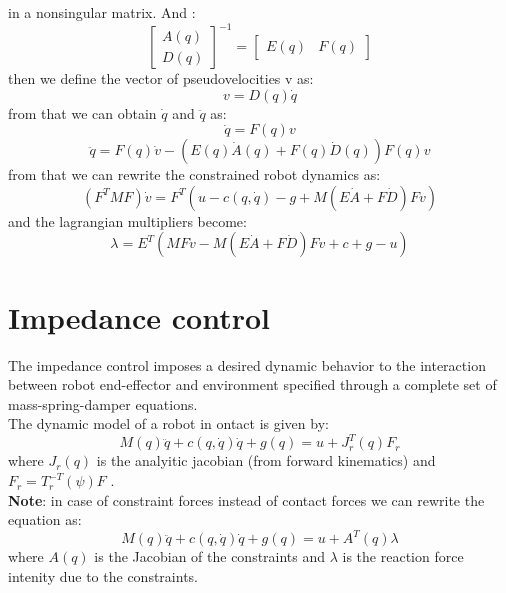 \documentclass[a4paper,12pt]{article}
\begin{document}
in a nonsingular matrix.
And :
\begin{equation}
    \begin{bmatrix}
        A(q)\\
        D(q)
    \end{bmatrix}^{-1}= \begin{bmatrix}
        E(q) & F(q)
    \end{bmatrix}
    \end{equation}
then we define the vector of pseudovelocities v as:
\begin{equation}
    v = D(q)\dot{q}
\end{equation}
from that we can obtain $\dot{q}$ and $\ddot{q}$ as:
\begin{equation}
    \dot{q} = F(q)v
\end{equation}
\begin{equation}
    \ddot{q} = F(q)\dot{v}  - (E(q)\dot{A}(q) + F(q)\dot{D}(q))F(q)v
\end{equation}
from that we can rewrite the constrained robot dynamics as:
\begin{equation}
   (F^TMF)\dot{v} = F^T(u-c(q,\dot{q})-g + M(E\dot{A}+F\dot{D})Fv)
\end{equation}
and the lagrangian multipliers become:
\begin{equation}
    \lambda = E^T(MF\dot{v}-M(E\dot{A}+F\dot{D})Fv + c + g -u)
\end{equation}

\section{Impedance control}
The impedance control imposes a desired dynamic 
behavior to the interaction between
robot end-effector and environment specified through a
complete set of mass-spring-damper equations.\\
The dynamic model of a robot in ontact is given by:
\begin{equation}
M(q)\ddot{q} + c(q,\dot{q})\dot{q} + g(q) = u + J_r^T(q)F_r
\end{equation}
where $J_r(q)$ is the analyitic jacobian (from forward kinematics)
and $F_r=T_r^{-T}(\psi)F$ .\\
\textbf{Note}: in case of constraint forces instead of contact
 forces we can rewrite the equation as:
\begin{equation}
    M(q)\ddot{q} + c(q,\dot{q})\dot{q} + g(q) = u + A^T(q)\lambda
\end{equation}
where $A(q)$ is the Jacobian of the constraints and $\lambda$ is 
the reaction force intenity due to the constraints.
\end{document}
